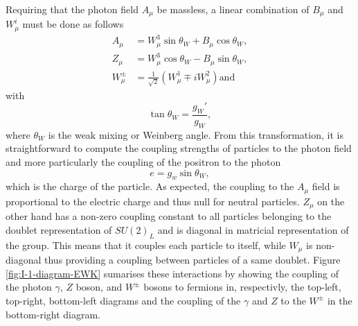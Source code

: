     Requiring that the photon field $ A_\mu $ be massless, a linear combination of $ B_\mu $ and $ W^i_\mu $ must be done as follows
    \begin{align}
      A_\mu & = W^3_\mu \sin \theta_W + B_\mu \cos \theta_W , \\
      Z_\mu & = W^3_\mu \cos \theta_W - B_\mu \sin \theta_W , \\
      W^\pm_\mu & = \frac{1}{\sqrt{2}} \left( W^1_\mu \mp i W^2_\mu \right) \text{and}
    \end{align}
    with
    \begin{equation}
      \tan \theta_W = \frac{g_W'}{g_W} ,
    \end{equation}
    where $ \theta_W $ is the weak mixing or Weinberg angle. From this transformation, it is straightforward to compute the coupling strengths of particles to the photon field and more particularly the coupling of the positron to the photon
    \begin{equation}
      e = g_w \sin \theta_W ,
    \end{equation}
    which is the charge of the particle. As expected, the coupling to the $ A_\mu $ field is proportional to the electric charge and thus null for neutral particles. $ Z_\mu $ on the other hand has a non-zero coupling constant to all particles belonging to the doublet representation of $ SU(2)_L $ and is diagonal in matricial representation of the group. This means that it couples each particle to itself, while $ W_\mu $ is non-diagonal thus providing a coupling between particles of a same doublet. Figure \ref{fig:I-1-diagram-EWK} sumarises these interactions by showing the coupling of the photon $ \gamma $, $ Z $ boson, and $ W^\pm $ bosons to fermions in, respectivly, the top-left, top-right, bottom-left diagrams and the coupling of the $ \gamma $ and $ Z $ to the $ W^\pm $ in the bottom-right diagram.

